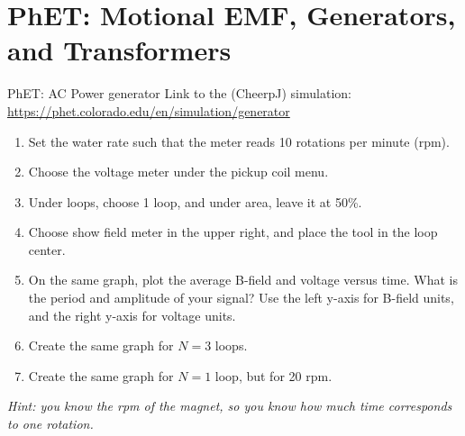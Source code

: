 \documentclass{beamer}
\begin{document}
\section{PhET: Motional EMF, Generators, and Transformers}

\begin{frame}{PhET: AC Power generator}
\footnotesize
Link to the (CheerpJ) simulation: \\ \vspace{0.2cm}
\url{https://phet.colorado.edu/en/simulation/generator}
\begin{enumerate}
\item Set the water rate such that the meter reads 10 rotations per minute (rpm).
\item Choose the voltage meter under the pickup coil menu.
\item Under loops, choose 1 loop, and under area, leave it at 50\%.
\item Choose show field meter in the upper right, and place the tool in the loop center.
\item On the same graph, plot the average B-field and voltage versus time.  What is the period and amplitude of your signal?  Use the left y-axis for B-field units, and the right y-axis for voltage units.
\item Create the same graph for $N = 3$ loops.
\item Create the same graph for $N = 1$ loop, but for 20 rpm.
\end{enumerate}
\textit{Hint: you know the rpm of the magnet, so you know how much time corresponds to one rotation.}
\end{frame}
\end{document}
